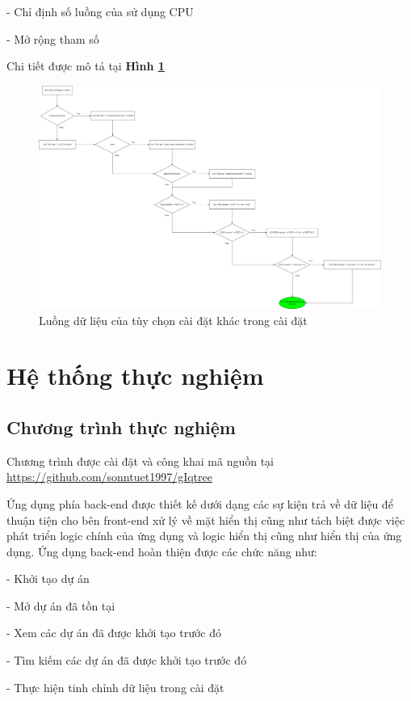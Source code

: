 \documentclass[12pt]{report}
\begin{document}
- Chỉ định số luồng của sử dụng CPU 

- Mở rộng tham số

 Chi tiết được mô tả tại \textbf{Hình \ref{fig:image4.13}}
 
 \begin{figure}[h]
	\centering
	\includegraphics[scale=0.2]{Image/4.13.png}
	\caption{Luồng dữ liệu của tùy chọn cài đặt khác trong cài đặt }
	\label{fig:image4.13}
\end{figure}

\newpage	
\chapter{Hệ thống thực nghiệm}
\label{chap:chapter5}
\section{Chương trình thực nghiệm }
Chương trình được cài đặt và công khai mã nguồn tại \url{ https://github.com/sonntuet1997/gIqtree }

Ứng dụng phía back-end được thiết kế dưới dạng các sự kiện trả về dữ liệu để thuận tiện cho bên front-end xử lý về mặt hiển thị cũng như tách biệt được việc phát triển logic chính của ứng dụng và logic hiển thị cũng như hiển thị của ứng dụng. 
Ứng dụng back-end hoàn thiện được các chức năng như:

- Khởi tạo dự án

- Mở dự án đã tồn tại

- Xem các dự án đã được khởi tạo trước đó

- Tìm kiếm các dự án đã được khởi tạo trước đó

- Thực hiện tinh chỉnh dữ liệu trong cài đặt
\end{document}
